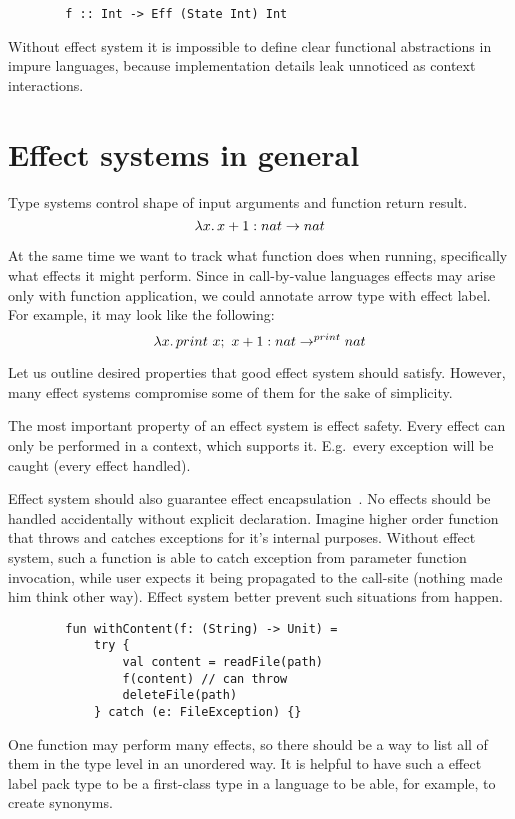 \documentclass[conference]{IEEEtran}
\newcommand{\seq}{;~}
\newcommand{\ap}{~}
\begin{document}
    \begin{verbatim}
        f :: Int -> Eff (State Int) Int
    \end{verbatim}

    Without effect system it is impossible to define clear functional abstractions in impure languages, because implementation details leak unnoticed as context interactions.


    \section{Effect systems in general}

    Type systems control shape of input arguments and function return result.
    \[\lambda x\ldotp x + 1 : nat\to nat\]

    At the same time we want to track what function does when running, specifically what effects it might perform.
    Since in call-by-value languages effects may arise only with function application, we could annotate arrow type with effect label.
    For example, it may look like the following:
    \[\lambda x\ldotp print \ap x\seq x + 1 : nat\to^{print} nat\]

    Let us outline desired properties that good effect system should satisfy.
    However, many effect systems compromise some of them for the sake of simplicity.

    The most important property of an effect system is effect safety.
    Every effect can only be performed in a context, which supports it.
    E.g.\ every exception will be caught (every effect handled).

    Effect system should also guarantee effect encapsulation~\cite{encapsulation}.
    No effects should be handled accidentally without explicit declaration.
    Imagine higher order function that throws and catches exceptions for it's internal purposes.
    Without effect system, such a function is able to catch exception from parameter function invocation, while user expects it being propagated to the call-site (nothing made him think other way).
    Effect system better prevent such situations from happen.
    \begin{verbatim}
        fun withContent(f: (String) -> Unit) =
            try {
                val content = readFile(path)
                f(content) // can throw
                deleteFile(path)
            } catch (e: FileException) {}
    \end{verbatim}

    One function may perform many effects, so there should be a way to list all of them in the type level in an unordered way.
    It is helpful to have such a effect label pack type to be a first-class type in a language to be able, for example, to create synonyms.
\end{document}
